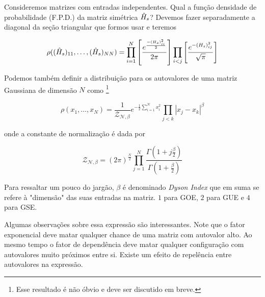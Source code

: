 Consideremos matrizes com entradas independentes. Qual a função densidade de probabilidade (F.P.D.) da matriz simétrica $\hat H_s$? Devemos fazer separadamente a diagonal da seção triangular que formos usar e teremos

\[
\rho((\hat H_s)_{11}, \dots, (\hat H_s)_{NN}) = \prod_{i=1}^{N} \left[ \frac{e^{\frac{-(H_s)^2_{ii}}{2}}}{2\pi} \right] \prod_{i<j} \left[ \frac{e^{-(H_s)^2_{ij}}}{\sqrt{\pi}} \right]
\]

Podemos também definir a distribuição para os autovalores de uma matriz Gaussiana de dimensão $N$ como \footnote{Esse resultado é não óbvio e deve ser discutido em breve.}

\begin{equation}
	\rho(x_1, \dots, x_N) = \frac{1}{\mathcal{Z_{N, \beta}}} e^{-\frac{1}{2} \sum_{i=1}^{N} x_i^2} \prod_{j<k} | x_j - x_k |^{\beta}
\end{equation}

onde a constante de normalização é dada por

\[
\mathcal{Z_{N, \beta}} = (2\pi)^\frac{N}{2} \prod_{j=1}^{N} \frac{\Gamma(1+ j\frac{\beta}{2})}{\Gamma(1+ \frac{\beta}{2})}
\]

Para ressaltar um pouco do jargão, $\beta$ é denominado \textit{Dyson Index} que em suma se refere à "dimensão" das suas entradas na matriz. $1$ para GOE, $2$ para GUE e $4$ para GSE.

Algumas observações sobre essa expressão são interessantes. Note que o fator exponencial deve matar qualquer chance de uma matriz com autovalor alto. Ao mesmo tempo o fator de dependência deve matar qualquer configuração com autovalores muito próximos entre si. Existe um efeito de repelência entre autovalores na expressão.